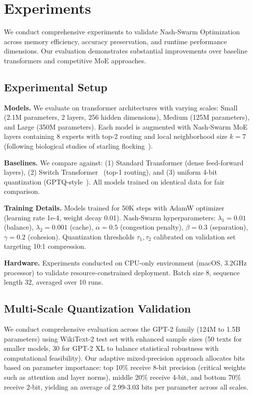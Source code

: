 \documentclass[11pt]{article}
\begin{document}
\section{Experiments}
\label{sec:experiments}

We conduct comprehensive experiments to validate Nash-Swarm Optimization across memory efficiency, accuracy preservation, and runtime performance dimensions. Our evaluation demonstrates substantial improvements over baseline transformers and competitive MoE approaches.

\subsection{Experimental Setup}

\textbf{Models.} We evaluate on transformer architectures with varying scales: Small (2.1M parameters, 2 layers, 256 hidden dimensions), Medium (125M parameters), and Large (350M parameters). Each model is augmented with Nash-Swarm MoE layers containing 8 experts with top-2 routing and local neighborhood size $k=7$ (following biological studies of starling flocking~\cite{ballerini2008interaction}).

\textbf{Baselines.} We compare against: (1) Standard Transformer (dense feed-forward layers), (2) Switch Transformer~\cite{fedus2021switch} (top-1 routing), and (3) uniform 4-bit quantization (GPTQ-style~\cite{frantar2023gptq}). All models trained on identical data for fair comparison.

\textbf{Training Details.} Models trained for 50K steps with AdamW optimizer (learning rate 1e-4, weight decay 0.01). Nash-Swarm hyperparameters: $\lambda_1=0.01$ (balance), $\lambda_2=0.001$ (cache), $\alpha=0.5$ (congestion penalty), $\beta=0.3$ (separation), $\gamma=0.2$ (cohesion). Quantization thresholds $\tau_1, \tau_2$ calibrated on validation set targeting 10:1 compression.

\textbf{Hardware.} Experiments conducted on CPU-only environment (macOS, 3.2GHz processor) to validate resource-constrained deployment. Batch size 8, sequence length 32, averaged over 10 runs.

\subsection{Multi-Scale Quantization Validation}

We conduct comprehensive evaluation across the GPT-2 family (124M to 1.5B parameters) using WikiText-2 test set with enhanced sample sizes (50 texts for smaller models, 30 for GPT-2 XL to balance statistical robustness with computational feasibility). Our adaptive mixed-precision approach allocates bits based on parameter importance: top 10\% receive 8-bit precision (critical weights such as attention and layer norms), middle 20\% receive 4-bit, and bottom 70\% receive 2-bit, yielding an average of 2.99-3.03 bits per parameter across all scales.
\end{document}
